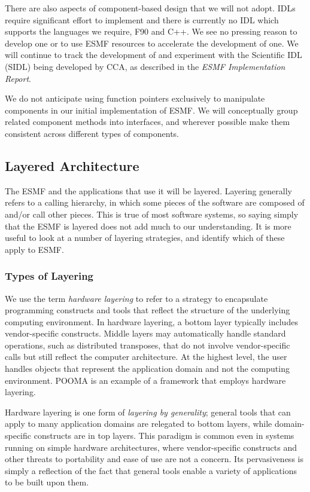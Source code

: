There are also aspects of component-based design that we will not adopt.
IDLs require significant effort to implement and there is currently no
IDL which supports the languages we require, F90 and C++.  We see no pressing
reason to develop one or to use ESMF resources to accelerate the development
of one.  We will continue to track the 
development of and experiment with the Scientific IDL (SIDL) being 
developed by CCA, as described in the {\it ESMF Implementation Report}.

We do not anticipate using function pointers exclusively to manipulate
components in our initial implementation of ESMF.  We will conceptually
group related component methods into interfaces, and wherever possible 
make them consistent across different types of components.

\subsection{Layered Architecture}

The ESMF and the applications that use it will be layered.  Layering generally 
refers to a calling hierarchy, in which some pieces of the software are composed 
of and/or call other pieces.  This is true of most software systems, so 
saying simply that the ESMF is layered does not add much to our understanding.  
It is more useful to look at a number of layering strategies, 
and identify which of these apply to ESMF.

\subsubsection{Types of Layering}

We use the term {\it hardware layering} to refer to a strategy to encapsulate 
programming constructs and tools that reflect the structure of the underlying 
computing environment.  In hardware layering, a bottom layer typically includes 
vendor-specific constructs.  Middle layers may automatically 
handle standard operations, such as distributed transposes, that do not involve  
vendor-specific calls but still reflect the computer architecture.  At the highest
level, the user handles objects that represent the application 
domain and not the computing environment.  POOMA is an example of a framework
that employs hardware layering.  

Hardware layering is one form of {\it layering by generality}; general 
tools that can apply to many application domains are relegated to bottom layers, 
while domain-specific constructs are in top layers.  This paradigm is
common even in systems running on simple hardware architectures, where 
vendor-specific
constructs and other threats to portability and ease of use are not a concern.
Its pervasiveness is simply a reflection of the fact that general tools 
enable a variety of applications to be built upon them.

